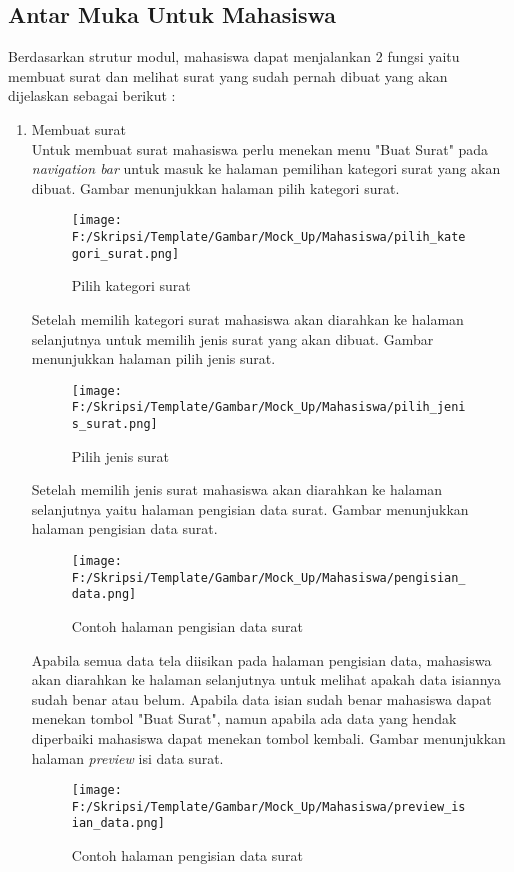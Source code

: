 \subsection{Antar Muka Untuk Mahasiswa}
\label{sec:antar_muka_mahasiswa}
Berdasarkan strutur modul, mahasiswa dapat menjalankan 2 fungsi yaitu membuat surat dan melihat surat yang sudah pernah dibuat yang akan dijelaskan sebagai berikut :

\begin{enumerate}
	\item Membuat surat\\
	Untuk membuat surat mahasiswa perlu menekan menu "Buat Surat" pada \textit{navigation bar} untuk masuk ke halaman pemilihan kategori surat yang akan dibuat. Gambar menunjukkan halaman pilih kategori surat.
	\begin{figure}[H]
	\centering
		\texttt{[image: F:/Skripsi/Template/Gambar/Mock\_Up/Mahasiswa/pilih\_kategori\_surat.png]}
		\caption{Pilih kategori surat}
		\label{fig:pilih_kategori_surat}
	\end{figure}
	
	Setelah memilih kategori surat mahasiswa akan diarahkan ke halaman selanjutnya untuk memilih jenis surat yang akan dibuat. Gambar menunjukkan halaman pilih jenis surat.
	\begin{figure}[H]
	\centering
		\texttt{[image: F:/Skripsi/Template/Gambar/Mock\_Up/Mahasiswa/pilih\_jenis\_surat.png]}
		\caption{Pilih jenis surat}
		\label{fig:pilih_jenis_surat}
	\end{figure}
	
	Setelah memilih jenis surat mahasiswa akan diarahkan ke halaman selanjutnya yaitu halaman pengisian data surat. Gambar menunjukkan halaman pengisian data surat.
	\begin{figure}[H]
	\centering
		\texttt{[image: F:/Skripsi/Template/Gambar/Mock\_Up/Mahasiswa/pengisian\_data.png]}
		\caption{Contoh halaman pengisian data surat}
		\label{fig:contoh_halaman_pengisian_data_surat}
	\end{figure}
	
	Apabila semua data tela diisikan pada halaman pengisian data, mahasiswa akan diarahkan ke halaman selanjutnya untuk melihat apakah data isiannya sudah benar atau belum. Apabila data isian sudah benar mahasiswa dapat menekan tombol "Buat Surat", namun apabila ada data yang hendak diperbaiki mahasiswa dapat menekan tombol kembali. Gambar menunjukkan halaman \textit{preview} isi data surat.
	\begin{figure}[H]
	\centering
		\texttt{[image: F:/Skripsi/Template/Gambar/Mock\_Up/Mahasiswa/preview\_isian\_data.png]}
		\caption{Contoh halaman pengisian data surat}
		\label{fig:contoh_halaman_pengisian_data_surat}
	\end{figure}
	

\end{enumerate}
